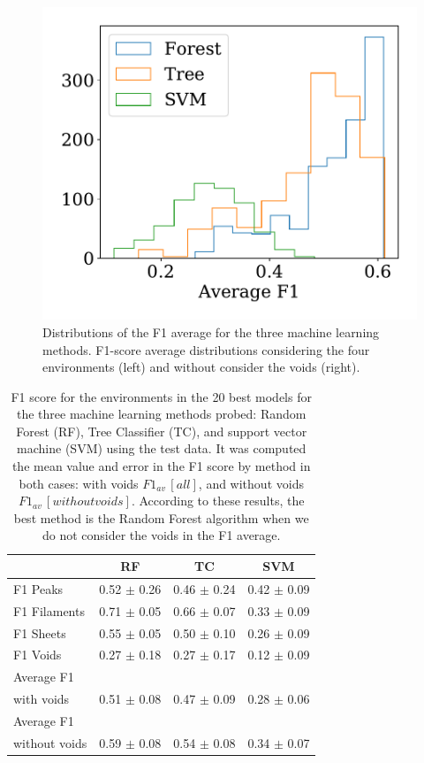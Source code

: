 \documentclass[usenatbib]{mnras}
\begin{document}
\begin{figure}
    \includegraphics[scale=0.55]{Figs/p_hist_f1.pdf}
    \caption{Distributions of the F1 average for the three machine
      learning methods. F1-score average distributions considering the
      four environments (left) and without consider the voids
      (right).} 
    \label{fig:methods}
\end{figure}



\begin{table}
\centering
\begin{tabular}{p{1.8cm}ccc}
\hline
                  & RF                & TC                & SVM               \\
\hline
 F1 Peaks               & 0.52 $\pm$ 0.26  & 0.46 $\pm$ 0.24 & 0.42 $\pm$ 0.09  \\
 F1 Filaments          & 0.71 $\pm$ 0.05 & 0.66 $\pm$ 0.07 & 0.33 $\pm$ 0.09 \\
 F1 Sheets             & 0.55 $\pm$ 0.05 & 0.50 $\pm$ 0.10 & 0.26 $\pm$ 0.09 \\
 F1 Voids              & 0.27 $\pm$ 0.18 & 0.27 $\pm$ 0.17 & 0.12 $\pm$ 0.09 \\
 Average F1\\ with voids    & 0.51 $\pm$ 0.08 & 0.47 $\pm$ 0.09 & 0.28 $\pm$ 0.06 \\
 Average F1\\ without voids & 0.59 $\pm$ 0.08 & 0.54 $\pm$ 0.08 & 0.34 $\pm$ 0.07 \\
\hline
\end{tabular}
\caption{F1 score for the environments 
in the 20 best models for
  the three machine learning methods probed: Random Forest (RF), Tree
  Classifier (TC), and support vector machine (SVM) using the test data. It was computed the mean value and error in the
  F1 score by method in both cases: with voids $F1_{av}\,[all]$, and
  without voids $F1_{av}\,[without voids]$. According to these
  results, the best method is the Random Forest algorithm when we do
  not consider the voids in the F1 average.} 
\label{tab:methods}
\end{table}
\end{document}

